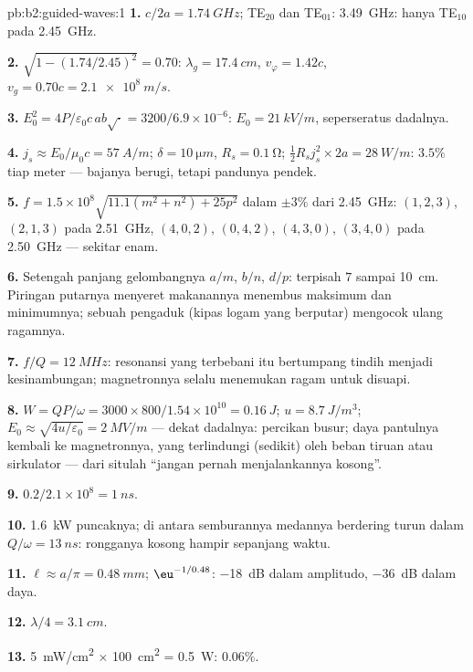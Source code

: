 \begin{solution}{pb:b2:guided-waves:1}
\textbf{1.} $c/2a = \qty{1.74}{GHz}$; TE$_{20}$ dan TE$_{01}$: \qty{3.49}{GHz}: hanya
TE$_{10}$ pada \qty{2.45}{GHz}.

\textbf{2.} $\sqrt{1 - (1.74/2.45)^2} = 0.70$: $\lambda_g = \qty{17.4}{cm}$, $v_\varphi = 1.42c$,
$v_g = 0.70c = \qty{2.1e8}{m/s}$.

\textbf{3.} $E_0^2 = 4P/\varepsilon_0c\,ab\sqrt{\cdot} = 3200/6.9 \times 10^{-6}$: $E_0 = \qty{21}{kV/m}$,
seperseratus dadalnya.

\textbf{4.} $j_s \approx E_0/\mu_0c = \qty{57}{A/m}$; $\delta = \qty{10}{\micro m}$, $R_s = \qty{0.1}{\ohm}$;
$\tfrac12R_sj_s^2 \times 2a = \qty{28}{W/m}$: $3.5\%$ tiap meter --- bajanya berugi,
tetapi pandunya pendek.

\textbf{5.} $f = 1.5 \times 10^8\sqrt{11.1(m^2 + n^2) + 25p^2}$ dalam $\pm3\%$ dari
\qty{2.45}{GHz}: $(1, 2, 3)$, $(2, 1, 3)$ pada \qty{2.51}{GHz}, $(4, 0, 2)$, $(0, 4, 2)$,
$(4, 3, 0)$, $(3, 4, 0)$ pada \qty{2.50}{GHz} --- sekitar enam.

\textbf{6.} Setengah panjang gelombangnya $a/m$, $b/n$, $d/p$: terpisah $7$ sampai \qty{10}{cm}.
Piringan putarnya menyeret makanannya menembus maksimum dan minimumnya; sebuah pengaduk (kipas
logam yang berputar) mengocok ulang ragamnya.

\textbf{7.} $f/Q = \qty{12}{MHz}$: resonansi yang terbebani itu bertumpang tindih menjadi
kesinambungan; magnetronnya selalu menemukan ragam untuk disuapi.

\textbf{8.} $W = QP/\omega = 3000 \times 800/1.54 \times 10^{10} = \qty{0.16}{J}$; $u = \qty{8.7}{J/m^3}$;
$E_0 \approx \sqrt{4u/\varepsilon_0} = \qty{2}{MV/m}$ --- dekat dadalnya: percikan busur; daya
pantulnya kembali ke magnetronnya, yang terlindungi (sedikit) oleh beban
tiruan atau sirkulator --- dari situlah ``jangan pernah menjalankannya kosong''.

\textbf{9.} $0.2/2.1 \times 10^8 = \qty{1}{ns}$.

\textbf{10.} \qty{1.6}{kW} puncaknya; di antara semburannya medannya berdering turun dalam
$Q/\omega = \qty{13}{ns}$: rongganya kosong hampir sepanjang waktu.

\textbf{11.} $\ell \approx a/\pi = \qty{0.48}{mm}$; $\eu^{-1/0.48}$: \qty{-18}{dB} dalam amplitudo,
\qty{-36}{dB} dalam daya.

\textbf{12.} $\lambda/4 = \qty{3.1}{cm}$.

\textbf{13.} \qty{5}{mW/cm^2} $\times$ \qty{100}{cm^2} = \qty{0.5}{W}: $0.06\%$.


\end{solution}
